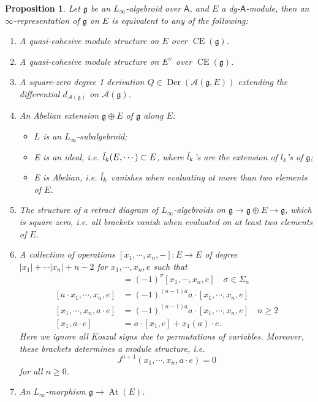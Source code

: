 \documentclass[12pt]{amsart}
\newtheorem{prop}[thm]{Proposition}
\theoremstyle{definition}
\theoremstyle{remark}
\numberwithin{equation}{section}
\newcommand{\CA}{{\mathcal A}}
\newcommand{\1}{{\mathbb{1}}}
\newcommand{\g}{\mathfrak{g}}
\newcommand{\CE}{\operatorname{CE}}
\newcommand{\At}{\operatorname{At}}
\newcommand{\der}{\operatorname{Der}}
\begin{document}
\begin{prop}
    Let $\g$ be an $L_{\infty}$-algebroid over $\mathsf{A}$, and $E$ a dg-$\mathsf{A}$-module, then an $\infty$-representation of $\g$
 on $E$ is equivalent to any of the following:
 \begin{enumerate}
    \item A quasi-cohesive module structure on $E$ over $\CE(\g)$.
    \item A quasi-cohesive module structure on $E^{\vee}$ over $\CE(\g)$.
    \item A square-zero degree 1 derivation $Q \in \der(\CA(\g, E))$ extending the differential $d_{\CA(\g)}$ on $\CA(\g)$.
    
     \item An Abelian extension $\g \oplus E$ of $\g$ along $E$:
     \begin{itemize}
         \item $L$ is an $L_{\infty}$-subalgebroid;
         \item E is an ideal, i.e. $\Tilde{l}_k(E, \cdots) \subset E$, where $\Tilde{l}_k$'s are the extension of $l_k$'s of $\g$;
         \item E is Abelian, i.e. $\Tilde{l}_k$ vanishes when evaluating at more than two elements of $E$.
     \end{itemize}
     
    \item The structure of a retract diagram of $L_{\infty}$-algebroids on $\g \to \g \oplus E \to \g$, which is square zero, i.e. all brackets vanish when evaluated on at least two elements of $E$.
    
     \item A collection of operations $[x_1, \cdots, x_n, -]: E \to E$ of degree $|x_1| + \cdots |x_n| + n - 2$ for $x_1, \cdots, x_n, e$ such that 
     \begin{align*}
         [x_{\sigma(1)}, \cdots, x_{\sigma(n)}, e] &= (-1)^{\sigma}[x_1, \cdots, x_n, e] \quad \sigma \in \Sigma_n\\
         [a\cdot x_1, \cdots, x_n, e] &= (-1)^{(n-1)a} a \cdot [x_1, \cdots, x_n, e]\\
         [ x_1, \cdots, x_n, a\cdot e] &= (-1)^{(n-1)a} a \cdot [x_1, \cdots, x_n, e] \quad n \ge 2\\
         [x_1, a\cdot e] &= a\cdot [x_1, e]+ x_1(a)\cdot e. 
     \end{align*}
     Here we ignore all Koszul signs due to permutations of variables. Moreover, these brackets determines a module structure, i.e.
     \begin{equation*}
         J^{n+1}(x_1, \cdots, x_n, a\cdot e) = 0
     \end{equation*}
     for all $n \ge 0$.
     
     
     \item An $L_{\infty}$-morphism $\g \to \At(E)$.
     
 \end{enumerate}\end{prop}
 
\end{document}
